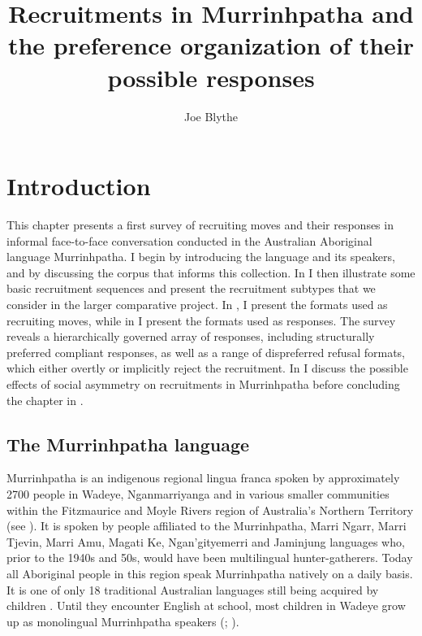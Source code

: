 \documentclass[output=paper,nonflat,colorlinks,citecolor=brown]{langsci/langscibook}
\author{Joe Blythe\affiliation{Department of Linguistics, Macquarie University}}
\title{Recruitments in Murrinhpatha and the preference organization of their possible responses}
\begin{document}
\maketitle
\label{sec:blythe}

\section{Introduction}\label{sec:blythe:1}

This chapter presents a first survey of recruiting moves and their responses in informal face-to-face conversation conducted in the Australian Aboriginal language Murrinhpatha. I begin by introducing the language and its speakers, and by discussing the corpus that informs this collection. In  I then illustrate some basic recruitment sequences and present the recruitment subtypes that we consider in the larger comparative project. In , I present the formats used as recruiting moves, while in  I present the formats used as responses. The survey reveals a hierarchically governed array of responses, including structurally preferred compliant responses, as well as a range of dispreferred refusal formats, which either overtly or implicitly reject the recruitment. In  I discuss the possible effects of social asymmetry on recruitments in Murrinhpatha before concluding the chapter in .

\subsection{The Murrinhpatha language}\label{sec:blythe:1.1}

Murrinhpatha is an indigenous regional lingua franca spoken by approximately 2700 people in Wadeye, Nganmarriyanga and in various smaller communities within the Fitzmaurice and Moyle Rivers region of Australia’s Northern Territory (see ). It is spoken by people affiliated to the Murrinhpatha, Marri Ngarr, Marri Tjevin, Marri Amu, Magati Ke, Ngan’gityemerri and Jaminjung languages who, prior to the 1940s and 50s, would have been multilingual hunter-gatherers. Today all Aboriginal people in this region speak Murrinhpatha natively on a daily basis. It is one of only 18 traditional Australian languages still being acquired by children \citep[3]{aiatsis_national_2005}. Until they encounter English at school, most children in Wadeye grow up as monolingual Murrinhpatha speakers (\citealt{kelly_indigenous_2010}; \citealt{Forshaw-et-al2017}).
\end{document}
